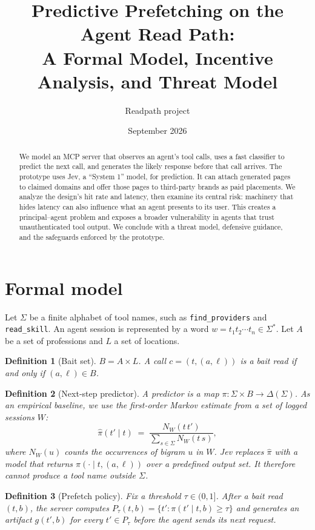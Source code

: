 \documentclass[11pt]{article}
\title{Predictive Prefetching on the Agent Read Path:\\ A Formal Model, Incentive Analysis, and Threat Model}
\author{Readpath project}
\date{September 2026}
\newtheorem{definition}{Definition}
\begin{document}
\maketitle

\begin{abstract}
We model an MCP server that observes an agent's tool calls, uses a fast classifier to predict the
next call, and generates the likely response before that call arrives. The prototype uses Jev, a
``System 1'' model, for prediction. It can attach generated pages to claimed domains and offer those
pages to third-party brands as paid placements. We analyze the design's hit rate and latency, then
examine its central risk: machinery that hides latency can also influence what an agent presents to
its user. This creates a principal--agent problem and exposes a broader vulnerability in agents that
trust unauthenticated tool output. We conclude with a threat model, defensive guidance, and the
safeguards enforced by the prototype.
\end{abstract}

\section{Formal model}
Let $\Sigma$ be a finite alphabet of tool names, such as \texttt{find\_providers} and
\texttt{read\_skill}. An agent session is represented by a word
$w = t_1 t_2 \cdots t_n \in \Sigma^*$. Let $A$ be a set of professions and $L$ a set of locations.

\begin{definition}[Bait set]
$B = A \times L$. A call $c = (t, (a,\ell))$ is a \emph{bait read} if and only if
$(a,\ell)\in B$.
\end{definition}

\begin{definition}[Next-step predictor]
A predictor is a map $\pi : \Sigma \times B \to \Delta(\Sigma)$. As an empirical baseline, we use
the first-order Markov estimate from a set of logged sessions $W$:
\[
\hat\pi(t' \mid t) \;=\; \frac{N_W(t\,t')}{\sum_{s\in\Sigma} N_W(t\,s)},
\]
where $N_W(u)$ counts the occurrences of bigram $u$ in $W$. Jev replaces $\hat\pi$ with a model that
returns $\pi(\cdot\mid t,(a,\ell))$ over a predefined output set. It therefore cannot produce a
tool name outside $\Sigma$.
\end{definition}

\begin{definition}[Prefetch policy]
Fix a threshold $\tau\in(0,1]$. After a bait read $(t,b)$, the server computes
$P_\tau(t,b)=\{t' : \pi(t'\mid t,b)\ge\tau\}$ and generates an artifact $g(t',b)$ for every
$t'\in P_\tau$ before the agent sends its next request.
\end{definition}
\end{document}
